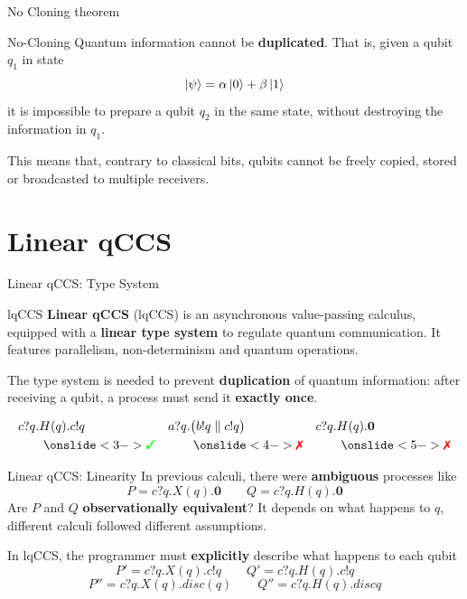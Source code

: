 \documentclass{beamer}
\newcommand{\cmark}{{\color{green} \text{\ding{51}}}}%
\newcommand{\xmark}{{\color{red} \text{\ding{55}}}}%
\newcommand{\kp}{\ket{\psi}}
\newcommand{\kz}{\ket{0}}
\newcommand{\ko}{\ket{1}}
\newcommand{\nil}{\mathbf{0}}
\begin{document}
\begin{frame}{No Cloning theorem}
\begin{block}{No-Cloning}
Quantum information cannot be \textbf{duplicated}. That is, given a qubit $q_1$ in state $$\kp = \alpha\kz + \beta\ko$$ it is impossible to prepare a qubit $q_2$ in the same state, without destroying the information in $q_1$.
\end{block}

\bigskip
This means that, contrary to classical bits, qubits cannot be freely copied, stored or broadcasted to multiple receivers.
\end{frame}


\section{Linear qCCS}
\begin{frame}{Linear qCCS: Type System}
\begin{block}{lqCCS}
\textbf{Linear qCCS} (lqCCS) is an asynchronous value-passing calculus, equipped with a \textbf{linear type system} to regulate quantum communication. It features parallelism, non-determinism and quantum operations.
\end{block}

\bigskip

\pause
The type system is needed to prevent \textbf{duplication} of quantum information: after receiving a qubit, a process must send it \textbf{exactly once}. 

\begin{align*}
& c?q.H(q).c!q  & &  a?q.\big(b!q \parallel c!q\big) \  & & c?q.H(q).\nil \  \\
& \qquad\onslide<3->{\cmark}  & & \qquad\onslide<4->{\xmark} & & \qquad\onslide<5->{\xmark}
\end{align*}

\end{frame}

\begin{frame}{Linear qCCS: Linearity}
In previous calculi, there were \textbf{ambiguous} processes like 
\[
 P = c?q.X(q).\nil \qquad Q = c?q.H(q).\nil
\]
\pause
Are $P$ and $Q$ \textbf{observationally equivalent}? It depends on what happens to $q$, different calculi followed different assumptions.

\bigskip

\pause
In lqCCS, the programmer must \textbf{explicitly} describe what happens to each qubit
\[
 P' = c?q.X(q).c!q \qquad Q' = c?q.H(q).c!q
\]
\[
 P'' = c?q.X(q).disc(q) \qquad Q'' = c?q.H(q).discq
\]
\end{frame}
\end{document}
